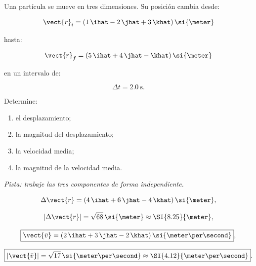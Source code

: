 \begin{ejercicio}
Una partícula se mueve en tres dimensiones. Su posición cambia desde:

\[
\vect{r}_i
=
(1\,\ihat-2\,\jhat+3\,\khat)\,\si{\meter}
\]

hasta:

\[
\vect{r}_f
=
(5\,\ihat+4\,\jhat-\khat)\,\si{\meter}
\]

en un intervalo de:

\[
\Delta t=\SI{2.0}{\second}.
\]

Determine:

\begin{enumerate}[label=\alph*)]
    \item el desplazamiento;
    \item la magnitud del desplazamiento;
    \item la velocidad media;
    \item la magnitud de la velocidad media.
\end{enumerate}

\textit{Pista: trabaje las tres componentes de forma independiente.}
\end{ejercicio}

\begin{respuesta}
\[
\Delta\vect{r}
=
(4\,\ihat+6\,\jhat-4\,\khat)\,\si{\meter},
\]

\[
|\Delta\vect{r}|
=
\sqrt{68}\,\si{\meter}
\approx
\SI{8.25}{\meter},
\]

\[
\boxed{
\vect{\bar{v}}
=
(2\,\ihat+3\,\jhat-2\,\khat)
\,\si{\meter\per\second}
},
\]

\[
\boxed{
|\vect{\bar{v}}|
=
\sqrt{17}\,\si{\meter\per\second}
\approx
\SI{4.12}{\meter\per\second}
}.
\]
\end{respuesta}

